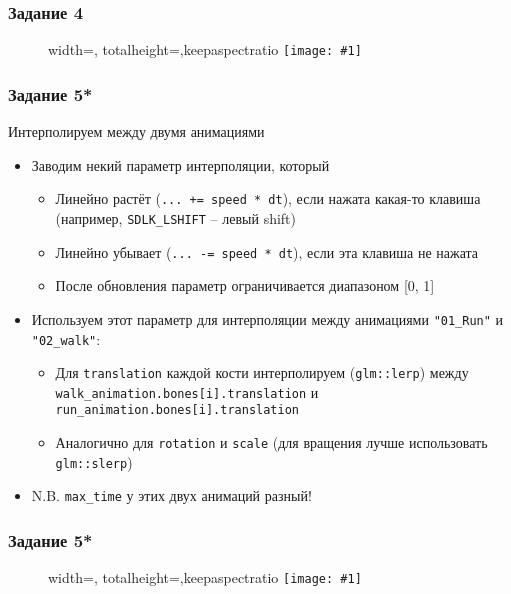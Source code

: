 \documentclass{beamer}
\newcommand{\slideimage}[1]{
  \begin{figure}
    \begin{adjustbox}{width=\textwidth, totalheight=\textheight-2\baselineskip-2\baselineskip,keepaspectratio}
      \texttt{[image: \#1]}
    \end{adjustbox}
  \end{figure}
}
\begin{document}
\begin{frame}[fragile]
\frametitle{Задание 4}
\slideimage{4.png}
\end{frame}

\begin{frame}[fragile]
\frametitle{Задание 5*}
Интерполируем между двумя анимациями
\begin{itemize}
\item Заводим некий параметр интерполяции, который
\begin{itemize}
\item Линейно растёт (\verb|... += speed * dt|), если нажата какая-то клавиша (например, \verb|SDLK_LSHIFT| -- левый shift)
\item Линейно убывает (\verb|... -= speed * dt|), если эта клавиша не нажата
\item После обновления параметр ограничивается диапазоном [0, 1]
\end{itemize}
\item Используем этот параметр для интерполяции между анимациями \verb|"01_Run"| и \verb|"02_walk"|:
\begin{itemize}
\item Для \verb|translation| каждой кости интерполируем (\verb|glm::lerp|) между \verb|walk_animation.bones[i].translation| и \verb|run_animation.bones[i].translation|
\item Аналогично для \verb|rotation| и \verb|scale| (для вращения лучше использовать \verb|glm::slerp|)
\end{itemize}
\item N.B. \verb|max_time| у этих двух анимаций разный!
\end{itemize}
\end{frame}

\begin{frame}[fragile]
\frametitle{Задание 5*}
\slideimage{5.png}
\end{frame}
\end{document}
